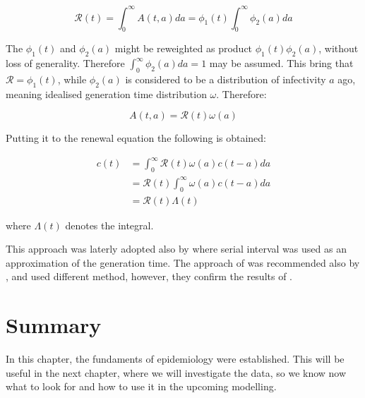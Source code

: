 \documentclass[
  digital, %
  oneside, %
  lof,     %
  lot,     %
]{fithesis4}
\begin{document}
\begin{equation}
  \mathcal{R}(t) = \int^{\infty}_0 A(t, a) da = \phi_1(t) \int^{\infty}_0 \phi_2(a) da
\end{equation}

The $\phi_1(t)$ and $\phi_2(a)$ might be reweighted as 
product $\phi_1(t) \phi_2(a)$, without loss of generality. 
Therefore $\int^{\infty}_0 \phi_2(a) da = 1$ may be assumed. 
This bring that $\mathcal{R} = \phi_1(t)$, while $\phi_2(a)$ 
is considered to be a distribution of infectivity $a$ ago, 
meaning idealised generation time distribution $\omega$. 
Therefore:

\begin{equation}
A(t, a) = \mathcal{R}(t) \omega(a)
\end{equation}

Putting it to the renewal equation the following is obtained:

\begin{equation}
  \begin{split}
    c(t) & = \int^{\infty}_0 \mathcal{R}(t) \omega(a) c(t - a) da \\
    & = \mathcal{R}(t) \int^{\infty}_0 \omega(a) c(t - a) da\\
    & = \mathcal{R}(t) \Lambda(t)    
  \end{split}
\end{equation}

where $\Lambda(t)$ denotes the integral.

This approach was laterly adopted also by \cite{cori2013} where serial 
interval was used as an approximation of the generation time.
The approach of \cite{cori2013} was recommended also by \cite{gostic2020},
and \cite{hasan2020} used different method, however, they confirm the 
results of \cite{cori2013}.


\section{Summary}

In this chapter, the fundaments of epidemiology were established.
This will be useful in the next chapter, where we will investigate
the data, so we know now what to look for and how to use it in
the upcoming modelling.


\end{document}

